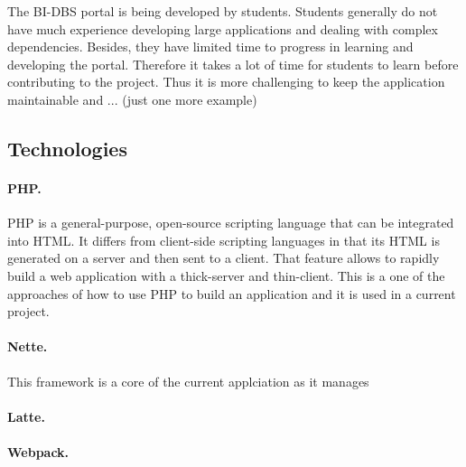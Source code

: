 \noindent The BI-DBS portal is being developed by students. Students generally do not have much experience developing large applications and dealing with complex dependencies. Besides, they have limited time to progress in learning and developing the portal. Therefore it takes a lot of time for students to learn before contributing to the project. Thus it is more challenging to keep the application maintainable and ... (just one more example)


\subsection{Technologies}
\paragraph*{PHP.} PHP is a general-purpose, open-source scripting language that can be integrated into HTML. It differs from client-side scripting languages in that its HTML is generated on a server and then sent to a client. That feature allows to rapidly build a web application with a thick-server and thin-client. This is a one of the approaches of how to use PHP to build an application and it is used in a current project.
\paragraph*{Nette.} This framework is a core of the current applciation as it manages 

\paragraph*{Latte.} 

\paragraph*{Webpack.}









